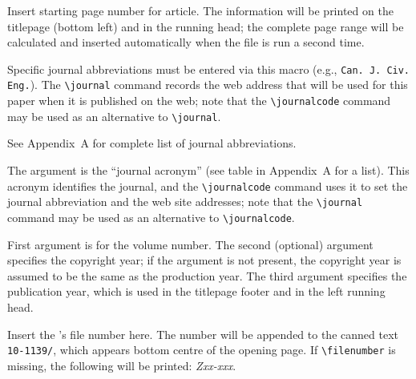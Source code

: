 \begin{description} \itemsep=0pt
   \item [{\tt \blash
         setcounter\char`\{page\char`\}\char`\{...\char`\}}] \mbox{}  

         Insert starting page number for article. The information will
         be printed on the titlepage (bottom left) and in the running
         head; the complete page range will be calculated and inserted
         automatically when the file is run a second time.

\newpage


   \item [{\tt \blash journal\char`\{...\char`\}}] \mbox{}

         Specific journal abbreviations must be entered via this macro
         (e.g., \verb|Can. J. Civ. Eng.|).
         The \verb|\journal| command records the web address that
         will be used for this paper when it is published on the web;
         note that the \verb|\journalcode| command may be used as an
         alternative to \verb|\journal|.

         See Appendix~A for complete list of journal abbreviations.


   \item [{\tt \blash journalcode\char`\{...\char`\}}] \mbox{}

         The argument is the ``journal acronym'' (see table in
         Appendix~A for a list).  This acronym identifies the journal,
         and the \verb|\journalcode| command uses it to set the
         journal abbreviation and the web site addresses; note that
         the \verb|\journal| command may be used as an alternative to
         \verb|\journalcode|.


   \item [{\tt \blash
         volyear\char`\{...\char`\}[...]\char`\{...\char`\}}] \mbox{} 

         First argument is for the volume number. The second
         (optional) argument specifies the copyright year; if the
         argument is not present, the copyright year is assumed to be
         the same as the production year. The third argument
         specifies the publication year, which is used in the
         titlepage footer and in the left running head.


   \item [{\tt \blash filenumber\char`\{...\char`\}}] \mbox{}

         Insert the \NRC's file number here.\label{filenumber} The
         number will be appended to the canned text \verb|10-1139/|,
         which appears bottom centre of the
         opening page. If \verb|\filenumber| is missing, the following
         will be printed: {\it Zxx-xxx\/}. 


\end{description}
